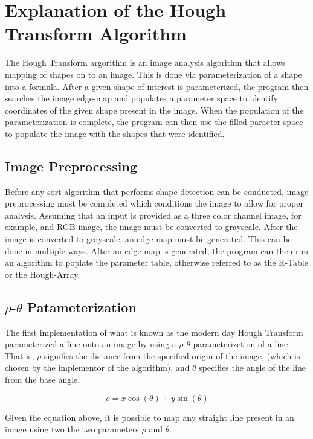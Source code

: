 \documentclass[conference]{IEEEtran}
\begin{document}
\section{Explanation of the Hough Transform Algorithm}
The Hough Transform argorithm is an image analysis algorithm that allows mapping of shapes on to an image. 
This is done via parameterization of a shape into a formula. 
After a given shape of interest is parameterized, the program then searches the image edge-map and populates a parameter space to identify coordinates of the given shape present in the image. 
When the population of the parameterization is complete, the program can then use the filled paraeter space to populate the image with the shapes that were identified.



\subsection{Image Preprocessing}
Before any sort algorithm that performs shape detection can be conducted, image preprocessing must be completed which conditions the image to allow for proper analysis. 
Assuming that an input is provided as a three color channel image, for example, and RGB image, the image must be converted to grayscale. 
After the image is converted to grayscale, an edge map must be generated. This can be done in multiple ways. 
After an edge map is generated, the program can then run an algorithm to poplate the parameter table, otherwise referred to as the R-Table or the Hough-Array. 




\subsection{$\rho$-$\theta$ Patameterization}
The first implementation of what is known as the modern day Hough Transform parameterized a line onto an image by using a $\rho$-$\theta$ parameterizetion of a line. 
That is, $\rho$ signifies the distance from the specified origin of the image, (which is chosen by the implementor of the algorithm), and $\theta$ specifies the angle of the line from the base angle. 

\begin{equation}
  \rho = x \cos(\theta) + y \sin(\theta) 
  \label{eq:rho-theta-parameterization}
\end{equation}

Given the equation above, it is possible to map any straight line present in an image using two the two parameters $\rho$ and $\theta$. 
\end{document}
